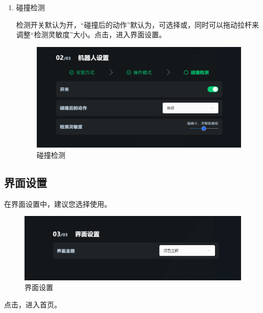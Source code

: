 \begin{enumerate}
\clearpage

\item 碰撞检测

	检测开关默认为开，“碰撞后的动作”默认为，可选择或，同时可以拖动拉杆来调整“检测灵敏度”大小。点击，进入界面设置。

	\begin{figure}[ht]
		\centering
		\includegraphics[width=\textwidth]{screen/2-8.png}
		\caption{碰撞检测}
		\label{fig:碰撞检测}
	\end{figure}


\end{enumerate}

\subsection{界面设置}

在界面设置中，建议您选择使用。

\begin{figure}[ht]
	\centering
	\includegraphics[width=\textwidth]{screen/2-9.png}
	\caption{界面设置}
	\label{fig:界面设置}
\end{figure}

点击，进入\LM 首页。

